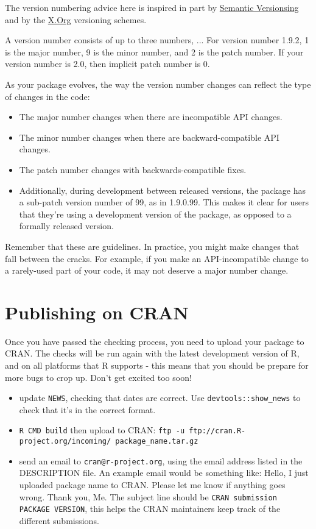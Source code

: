 The version numbering advice here is inspired in part by
\href{http://semver.org}{Semantic Versionsing} and by the
\href{http://www.x.org/releases/X11R7.7/doc/xorg-docs/Versions.html}{X.Org}
versioning schemes.

A version number consists of up to three numbers,
\emph{}.\emph{}.\emph{}. For version number 1.9.2, 1 is the major
number, 9 is the minor number, and 2 is the patch number. If your
version number is 2.0, then implicit patch number is 0.

As your package evolves, the way the version number changes can reflect
the type of changes in the code:

\begin{itemize}
\itemsep1pt\parskip0pt
\item
  The major number changes when there are incompatible API changes.
\item
  The minor number changes when there are backward-compatible API
  changes.
\item
  The patch number changes with backwards-compatible fixes.
\item
  Additionally, during development between released versions, the
  package has a sub-patch version number of 99, as in 1.9.0.99. This
  makes it clear for users that they're using a development version of
  the package, as opposed to a formally released version.
\end{itemize}

Remember that these are guidelines. In practice, you might make changes
that fall between the cracks. For example, if you make an
API-incompatible change to a rarely-used part of your code, it may not
deserve a major number change.

\section{Publishing on CRAN}

Once you have passed the checking process, you need to upload your
package to CRAN. The checks will be run again with the latest
development version of R, and on all platforms that R supports - this
means that you should be prepare for more bugs to crop up. Don't get
excited too soon!

\begin{itemize}
\item
  update \texttt{NEWS}, checking that dates are correct. Use
  \texttt{devtools::show\_news} to check that it's in the correct
  format.
\item
  \texttt{R CMD build} then upload to CRAN:
  \texttt{ftp -u ftp://cran.R-project.org/incoming/ package\_name.tar.gz}
\item
  send an email to \texttt{cran@r-project.org}, using the email address
  listed in the DESCRIPTION file. An example email would be something
  like: Hello, I just uploaded package name to CRAN. Please let me know
  if anything goes wrong. Thank you, Me. The subject line should be
  \texttt{CRAN submission PACKAGE VERSION}, this helps the CRAN
  maintainers keep track of the different submissions.
\end{itemize}


